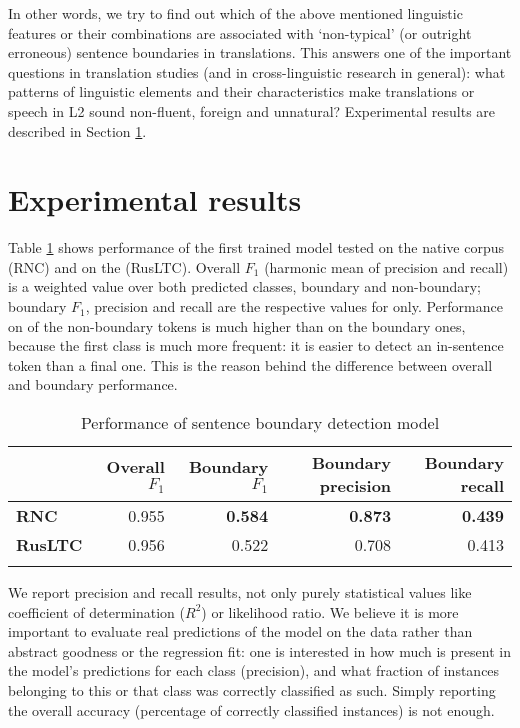 \documentclass[output=paper]{langsci/langscibook.cls}
\begin{document}
In other words, we try to find out which of the above mentioned linguistic features or their combinations are associated with `non-typical' (or outright erroneous) sentence boundaries in translations. This answers one of the important questions in translation studies (and in cross-linguistic research in general): what patterns of linguistic elements and their characteristics make translations or  speech in L2 sound non-fluent, foreign and unnatural? Experimental results are described in Section \ref{sec:experiment}.

\section{Experimental results}\label{sec:experiment} 
Table \ref{tab:1:performance} shows performance of the first trained model tested on the native corpus (RNC) and on the  (RusLTC). Overall $F_{1}$ (harmonic mean of precision and recall) is a weighted value over both predicted classes, boundary and non-boundary; boundary $F_{1}$, precision and recall are the respective values for  only. Performance on  of the non-boundary tokens is much higher than on the boundary ones, because the first class is much more frequent: it is easier to detect an in-sentence token than a final one. This is the reason behind the difference between overall and boundary performance.
 \begin{table}
\caption{Performance of sentence boundary detection model}
\label{tab:1:performance}
 \begin{tabular}{lrrrr} %
 \lsptoprule
            & Overall $F_{1}$ & Boundary $F_{1}$ & Boundary precision & Boundary recall\\ %
  \midrule
  \textbf{RNC} & 0.955 & \textbf{0.584} & \textbf{0.873} & \textbf{0.439}\\
  \textbf{RusLTC} & 0.956 & 0.522 & 0.708 & 0.413 \\  
  \lspbottomrule
  \end{tabular}
\end{table}

We report precision and recall results, not only purely statistical values like coefficient of determination ($R^2$) or likelihood ratio. We believe it is more important to evaluate real predictions of the model on the data rather than abstract goodness or the regression fit: one is interested in how much  is present in the model's predictions for each class (precision), and what fraction of instances belonging to this or that class was correctly classified as such. Simply reporting the overall accuracy (percentage of correctly classified instances) is not enough. 
\end{document}
